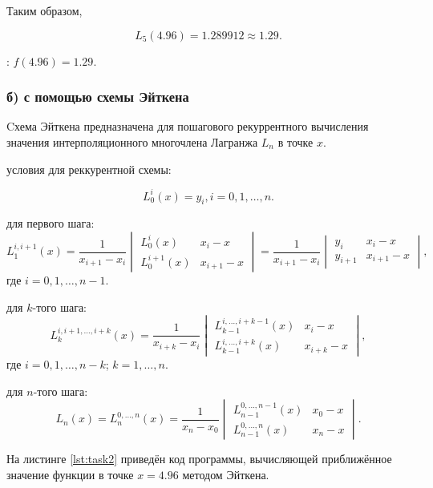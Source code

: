 Таким образом,

\[
L_5(4.96) = 1.289912 \approx 1.29.
\]

: $f(4.96) = 1.29.$

\subsubsection*{б) с помощью схемы Эйткена}

Cхема Эйткена предназначена для пошагового рекуррентного вычисления значения интерполяционного многочлена Лагранжа $L_n$ в точке $x$.

 условия для реккурентной схемы:

\[
L^i_0(x) = y_i, i = 0, 1, \dots, n.
\]

 для первого шага:
\[
L_{1}^{i,i+1}(x)= \frac{1}{x_{i+1} - x_i} \begin{vmatrix} L_0^i(x) & x_i - x \\ L_0^{i+1}(x) & x_{i+1} - x \end{vmatrix} = \frac{1}{x_{i+1} - x_i} \begin{vmatrix} y_i & x_i - x \\ y_{i+1} & x_{i+1} - x \end{vmatrix},
\]
где $i= 0, 1,\dots, n- 1$.

 для $k$-того шага:
\[
L_k^{i,i+1,\dots,i+k}(x)= \frac{1}{x_{i+k} - x_i} \begin{vmatrix} L_{k-1}^{i,\dots,i+k-1}(x) & x_i - x \\ L_{k-1}^{i,\dots,i+k}(x) & x_{i+k} - x \end{vmatrix},
\]
где $i= 0, 1,\dots, n- k$; $k= 1,\dots, n$.

 для $n$-того шага:
\[
L_n(x) = L_n^{0,\dots,n}(x)= \frac{1}{x_{n} - x_0} \begin{vmatrix} L_{n-1}^{0,\dots,n-1}(x) & x_0 - x \\ L_{n-1}^{0,\dots,n}(x) & x_{n} - x \end{vmatrix}.
\]

На листинге \ref{lst:task2} приведён код программы, вычисляющей приближённое значение функции в точке $x=4.96$ методом Эйткена.

